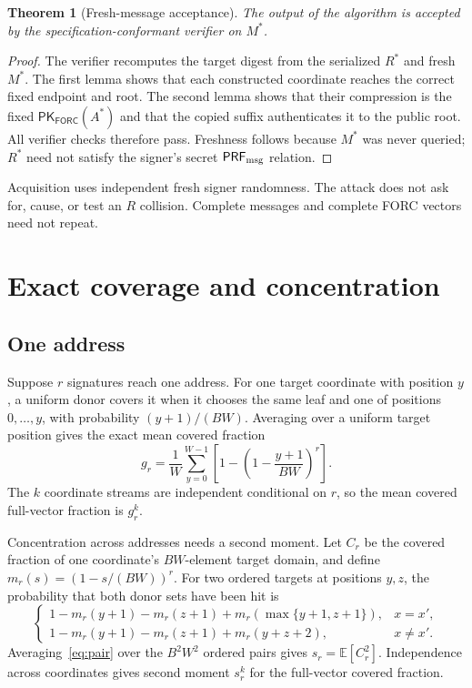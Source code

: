 \documentclass[11pt,a4paper]{article}
\newtheorem{theorem}{Theorem}
\newcommand{\PRFmsg}{\ensuremath{\mathsf{PRF}_{\rm msg}}}
\newcommand{\FORC}{\ensuremath{\mathsf{FORC}}}
\newcommand{\E}{\mathbb E}
\begin{document}
\begin{theorem}[Fresh-message acceptance]
The output of the algorithm is accepted by the specification-conformant
verifier on $M^*$.
\end{theorem}
\begin{proof}
The verifier recomputes the target digest from the serialized $R^*$ and fresh
$M^*$.  The first lemma shows that each constructed coordinate reaches the
correct fixed endpoint and root.  The second lemma shows that their compression
is the fixed $\mathsf{PK}_{\FORC}(A^*)$ and that the copied suffix authenticates
it to the public root.  All verifier checks therefore pass.  Freshness follows
because $M^*$ was never queried; $R^*$ need not satisfy the signer's secret
$\PRFmsg$ relation.
\end{proof}

Acquisition uses independent fresh signer randomness.  The attack does not
ask for, cause, or test an $R$ collision.  Complete messages and complete FORC
vectors need not repeat.

\section{Exact coverage and concentration}

\subsection{One address}

Suppose $r$ signatures reach one address.  For one target coordinate with
position $y$, a uniform donor covers it when it chooses the same leaf and one
of positions $0,\ldots,y$, with probability $(y+1)/(BW)$.  Averaging over a
uniform target position gives the exact mean covered fraction
\begin{equation}
 g_r=\frac1W\sum_{y=0}^{W-1}
        \left[1-\left(1-\frac{y+1}{BW}\right)^r\right].       \label{eq:gr}
\end{equation}
The $k$ coordinate streams are independent conditional on $r$, so the mean
covered full-vector fraction is $g_r^k$.

Concentration across addresses needs a second moment.  Let $C_r$ be the
covered fraction of one coordinate's $BW$-element target domain, and define
$m_r(s)=(1-s/(BW))^r$.  For two ordered targets at positions $y,z$, the
probability that both donor sets have been hit is
\begin{equation}
 \begin{cases}
  1-m_r(y+1)-m_r(z+1)+m_r(\max\{y+1,z+1\}),&x=x',\\
  1-m_r(y+1)-m_r(z+1)+m_r(y+z+2),&x\ne x'.
 \end{cases}                                                \label{eq:pair}
\end{equation}
Averaging~\eqref{eq:pair} over the $B^2W^2$ ordered pairs gives
$s_r=\E[C_r^2]$.  Independence across coordinates gives second moment $s_r^k$
for the full-vector covered fraction.
\end{document}
